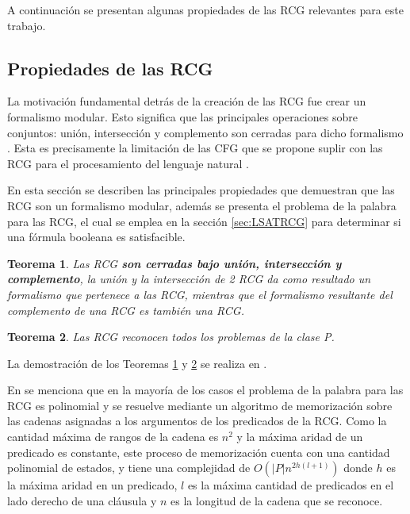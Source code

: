 \documentclass{article}
\newtheorem{theorem}{Teorema}
\begin{document}
A continuación se presentan algunas propiedades de las RCG relevantes para este trabajo.

\subsection{Propiedades de las RCG}

La motivación fundamental detrás de la creación de las RCG fue crear un formalismo modular. Esto significa que las principales operaciones sobre conjuntos: unión, intersección y complemento son cerradas para dicho formalismo \cite{mainRCGBib}.  Esta es precisamente la limitación de las CFG que se propone suplir con las RCG para el procesamiento del lenguaje natural \cite{mainRCGBib}.

En esta sección se describen las principales propiedades que demuestran que las RCG son un formalismo
modular, además se presenta el problema de la palabra
para las RCG, el cual se emplea en la sección \ref{sec:LSATRCG} para determinar si una fórmula booleana es satisfacible.

\begin{theorem}
    \label{teo:RCGset}
    Las RCG \textbf{son cerradas bajo unión, intersección y complemento}, la unión y la intersección de 2 RCG da como resultado un formalismo que pertenece a las RCG, mientras
    que el formalismo resultante del complemento de una RCG es también una RCG.
\end{theorem}

\begin{theorem}
    \label{teo:RCGrecP}
    Las RCG reconocen todos los problemas de la clase P.
\end{theorem}

La demostración de los Teoremas \ref{teo:RCGset} y \ref{teo:RCGrecP} se realiza en \cite{mainRCGBib}.

En \cite{mainRCGBib} se menciona que en la mayoría de los casos el problema de la palabra para las RCG es polinomial y se resuelve mediante un algoritmo de memorización sobre las cadenas asignadas a los argumentos de los predicados de la RCG.  Como la cantidad máxima de rangos de la cadena es $n^2$ y la máxima aridad de un predicado es constante, este proceso de memorización cuenta con una cantidad polinomial de estados, y tiene una complejidad de $O(|P|n^{2h(l+1)})$ donde $h$ es la máxima aridad en un predicado, $l$ es la máxima cantidad de predicados en el lado derecho de una cláusula y $n$ es la longitud de la cadena que se reconoce.
\end{document}
